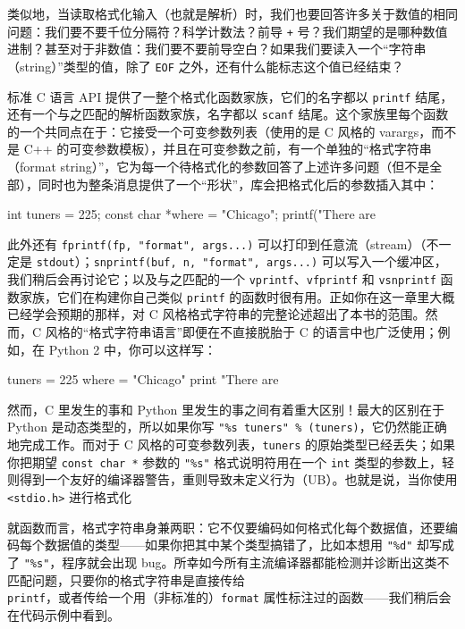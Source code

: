 类似地，当读取格式化输入（也就是解析）时，我们也要回答许多关于数值的相同问题：我们要不要千位分隔符？科学计数法？前导 \texttt{+} 号？我们期望的是哪种数值进制？甚至对于非数值：我们要不要前导空白？如果我们要读入一个“字符串（string）”类型的值，除了 \texttt{EOF} 之外，还有什么能标志这个值已经结束？

标准 C 语言 API 提供了一整个格式化函数家族，它们的名字都以 \texttt{printf} 结尾，还有一个与之匹配的解析函数家族，名字都以 \texttt{scanf} 结尾。这个家族里每个函数的一个共同点在于：它接受一个可变参数列表（使用的是 C 风格的 varargs，而不是 C++ 的可变参数模板），并且在可变参数之前，有一个单独的“格式字符串（format string）”，它为每一个待格式化的参数回答了上述许多问题（但不是全部），同时也为整条消息提供了一个“形状”，库会把格式化后的参数插入其中：

\begin{codebox}[cpp]
    int tuners = 225;
    const char *where = "Chicago";
    printf("There are %
\end{codebox}

此外还有 \texttt{fprintf(\allowbreak{}fp,\allowbreak{} "format",\allowbreak{} args...)\allowbreak{}} 可以打印到任意流（stream）（不一定是 \texttt{stdout}）；\texttt{snprintf(\allowbreak{}buf,\allowbreak{} n,\allowbreak{} "format",\allowbreak{} args...)\allowbreak{}} 可以写入一个缓冲区，我们稍后会再讨论它；以及与之匹配的一个 \texttt{vprintf}、\texttt{vfprintf} 和 \texttt{vsnprintf} 函数家族，它们在构建你自己类似 \texttt{printf} 的函数时很有用。正如你在这一章里大概已经学会预期的那样，对 C 风格格式字符串的完整论述超出了本书的范围。然而，C 风格的“格式字符串语言”即便在不直接脱胎于 C 的语言中也广泛使用；例如，在 Python 2 中，你可以这样写：

\begin{codebox}[cpp]
    tuners = 225
    where = "Chicago"
    print "There are %
\end{codebox}

然而，C 里发生的事和 Python 里发生的事之间有着重大区别！最大的区别在于 Python 是动态类型的，所以如果你写 \texttt{"\%s tuners" \% (\allowbreak{}tuners)\allowbreak{}}，它仍然能正确地完成工作。而对于 C 风格的可变参数列表，\texttt{tuners} 的原始类型已经丢失；如果你把期望 \texttt{const char *} 参数的 \texttt{"\%s"} 格式说明符用在一个 \texttt{int} 类型的参数上，轻则得到一个友好的编译器警告，重则导致未定义行为（UB）。也就是说，当你使用 \texttt{<stdio.\allowbreak{}h>\allowbreak{}} 进行格式化

就函数而言，格式字符串身兼两职：它不仅要编码如何格式化每个数据值，还要编码每个数据值的类型——如果你把其中某个类型搞错了，比如本想用 \texttt{"\%d"} 却写成了 \texttt{"\%s"}，程序就会出现 bug。所幸如今所有主流编译器都能检测并诊断出这类不匹配问题，只要你的格式字符串是直接传给 \texttt{printf}，或者传给一个用（非标准的）\texttt{format} 属性标注过的函数——我们稍后会在代码示例中看到。

